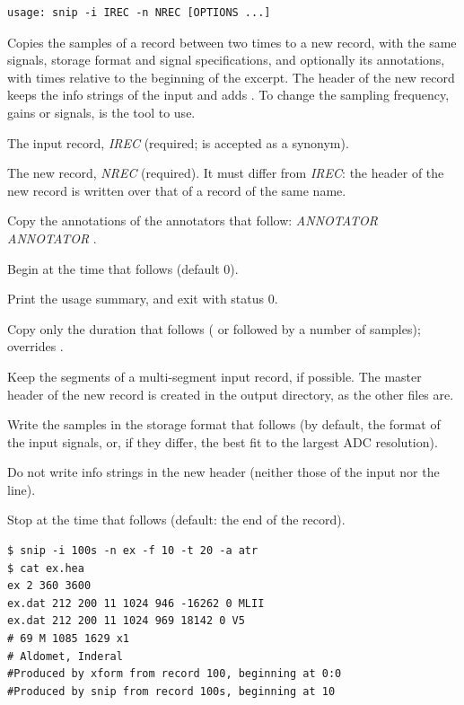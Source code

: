 \begin{lstlisting}[style=signature,language={}]
usage: snip -i IREC -n NREC [OPTIONS ...]
\end{lstlisting}
Copies the samples of a record between two times to a new record, with the same signals,
storage format and signal specifications, and optionally its annotations, with times
relative to the beginning of the excerpt. The header of the new record keeps the info
strings of the input and adds .
To change the sampling frequency, gains or signals,  is the tool to use.
\begin{params}
\item[-i] The input record, \textit{IREC} (required;  is accepted as a synonym).
\item[-n] The new record, \textit{NREC} (required). It must differ from \textit{IREC}: the
  header of the new record is written over that of a record of the same name.
\item[-a] Copy the annotations of the annotators that follow:
   \textit{ANNOTATOR} \code{[}\textit{ANNOTATOR} \code{...]}.
\item[-f] Begin at the time that follows (default 0).
\item[-h] Print the usage summary, and exit with status 0.
\item[-l] Copy only the duration that follows ( or  followed by a
  number of samples); overrides .
\item[-m] Keep the segments of a multi-segment input record, if possible. The master
  header of the new record is created in the output directory, as the other files are.
\item[-O] Write the samples in the storage format that follows (by default, the format of
  the input signals, or, if they differ, the best fit to the largest ADC resolution).
\item[-s] Do not write info strings in the new header (neither those of the input nor the
   line).
\item[-t] Stop at the time that follows (default: the end of the record).
\end{params}
\begin{lstlisting}[style=text]
$ snip -i 100s -n ex -f 10 -t 20 -a atr
$ cat ex.hea
ex 2 360 3600
ex.dat 212 200 11 1024 946 -16262 0 MLII
ex.dat 212 200 11 1024 969 18142 0 V5
# 69 M 1085 1629 x1
# Aldomet, Inderal
#Produced by xform from record 100, beginning at 0:0
#Produced by snip from record 100s, beginning at 10
\end{lstlisting}

